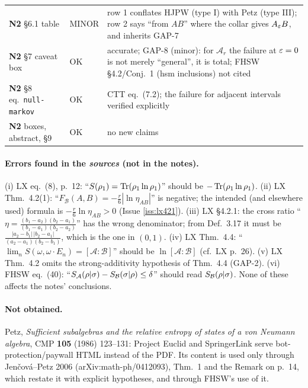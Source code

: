 \documentclass[11pt]{article}
\newcommand{\Ar}{\mathcal A_r}
\newcommand{\Fmi}{F}
\newcommand{\NII}{\textbf{N2}}
\newcommand{\loc}[1]{{\small\texttt{#1}}}
\newcommand{\1}{\mathbf 1}
\begin{document}
\begin{center}
\begin{longtable}{@{}p{}p{}p{}@{}}
\NII{} \S6.1 table & MINOR & row 1 conflates HJPW (type I) with Petz (type III); row 2 says ``from $AB$'' where the collar gives $A_\varepsilon B$, and inherits GAP-7\\
\NII{} \S7 caveat box & OK & accurate; GAP-8 (minor): for $\Ar$ the failure at $\varepsilon=0$ is not merely ``general'', it is total; FHSW \S4.2/Conj.~1 (hsm inclusions) not cited\\
\NII{} \S8 eq.~\loc{null-markov} & OK & CTT eq.~(7.2); the failure for adjacent intervals verified explicitly\\
\NII{} boxes, abstract, \S9 & OK & no new claims\\
\bottomrule
\end{longtable}
\end{center}

\paragraph{Errors found in the \emph{sources} (not in the notes).}
(i) LX eq.~(8), p.~12: ``$S(\rho_1)=\operatorname{Tr}(\rho_1\ln\rho_1)$'' should be $-\operatorname{Tr}(\rho_1\ln\rho_1)$.
(ii) LX Thm.~4.2(1): ``$\Fmi_{\mathcal B}(A,B)=-\frac r6|\ln\eta_{AB}|$'' is negative; the intended
(and elsewhere used) formula is $-\frac r6\ln\eta_{AB}>0$ (Issue \ref{iss:lx421}).
(iii) LX \S4.2.1: the cross ratio ``$\eta=\frac{(b_1-a_2)(b_2-a_1)}{(b_1-a_1)(b_2-a_2)}$'' has the wrong
denominator; from Def.~3.17 it must be $\frac{|a_2-b_1|\,|b_2-a_1|}{(a_2-a_1)(b_2-b_1)}$, which is the
one in $(0,1)$.
(iv) LX Thm.~4.4: ``$\lim_nS(\omega,\omega\cdot E_n)=[\mathcal A:\mathcal B]$'' should be
$\ln[\mathcal A:\mathcal B]$ (cf.\ LX p.~26).
(v) LX Thm.~4.2 omits the strong-additivity hypothesis of Thm.~4.4 (GAP-2).
(vi) FHSW eq.~(40): ``$S_{\mathcal A}(\rho|\sigma)-S_{\mathcal B}(\sigma|\rho)\le\delta$'' should read $S_{\mathcal B}(\rho|\sigma)$.
None of these affects the notes' conclusions.

\paragraph{Not obtained.}
Petz, \emph{Sufficient subalgebras and the relative entropy of states of a von Neumann algebra},
CMP \textbf{105} (1986) 123--131: Project Euclid and SpringerLink serve bot-protection/paywall HTML
instead of the PDF. Its content is used only through Jen\v{c}ov\'a--Petz 2006
(arXiv:math-ph/0412093), Thm.~1 and the Remark on p.~14, which restate it with explicit hypotheses,
and through FHSW's use of it.
\end{document}
